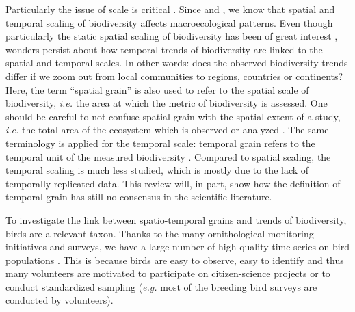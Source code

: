 \documentclass[
  12pt,
  oneside]{report}
\begin{document}
Particularly the issue of scale is critical \autocite{levin_problem_1992}. Since \textcite{arrhenius_species_1921} and \textcite{grinnell_role_1922}, we know that spatial and temporal scaling of biodiversity affects macroecological patterns. Even though particularly the static spatial scaling of biodiversity has been of great interest \autocite[\emph{e.g.}][]{storch_scaling_2007}, wonders persist about how temporal trends of biodiversity are linked to the spatial and temporal scales. In other words: does the observed biodiversity trends differ if we zoom out from local communities to regions, countries or continents? Here, the term ``spatial grain'' is also used to refer to the spatial scale of biodiversity, \emph{i.e.} the area at which the metric of biodiversity is assessed. One should be careful to not confuse spatial grain with the spatial extent of a study, \emph{i.e.} the total area of the ecosystem which is observed or analyzed \autocite{dungan_balanced_2002}. The same terminology is applied for the temporal scale: temporal grain refers to the temporal unit of the measured biodiversity \autocite{adler_power_2003}. Compared to spatial scaling, the temporal scaling is much less studied, which is mostly due to the lack of temporally replicated data. This review will, in part, show how the definition of temporal grain has still no consensus in the scientific literature.

To investigate the link between spatio-temporal grains and trends of biodiversity, birds are a relevant taxon. Thanks to the many ornithological monitoring initiatives and surveys, we have a large number of high-quality time series on bird populations \autocites{bejcek_velke_2016,kamp_population_2021,sauer_north_2013}. This is because birds are easy to observe, easy to identify and thus many volunteers are motivated to participate on citizen-science projects \autocite[\url{https://www.inaturalist.org/}]{sullivan_ebird_2009} or to conduct standardized sampling (\emph{e.g.} most of the breeding bird surveys are conducted by volunteers).
\end{document}
